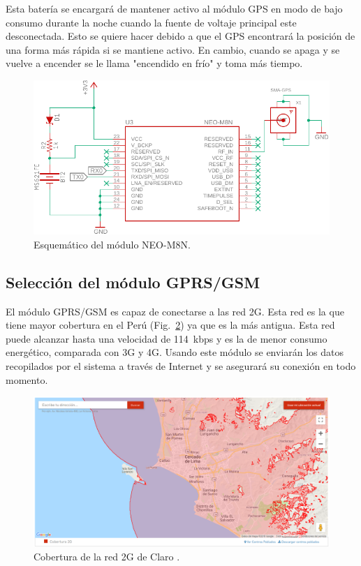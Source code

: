 Esta batería se encargará de mantener activo al módulo GPS en modo de bajo consumo durante la noche cuando la fuente de voltaje principal este desconectada. Esto se quiere hacer debido a que el GPS encontrará la posición de una forma más rápida si se mantiene activo. En cambio, cuando se apaga y se vuelve a encender se le llama "encendido en frío" y toma más tiempo.

\begin{figure}[htbp!]
\centering
\includegraphics[width=\textwidth]{GPS_esquem.pdf}
\caption{Esquemático del módulo NEO-M8N.}
\label{fig:GPS_esquem}
\end{figure}

\subsection{Selección del módulo GPRS/GSM}
El módulo GPRS/GSM es capaz de conectarse a las red 2G. Esta red es la que tiene mayor cobertura en el Perú (Fig.~\ref{fig:Cobertura}) ya que es la más antigua. Esta red puede alcanzar hasta una velocidad de \SI{114}{kbps} y es la de menor consumo energético, comparada con 3G y 4G. Usando este módulo se enviarán los datos recopilados por el sistema a través de Internet y se asegurará su conexión en todo momento.

\begin{figure}[hbtp!]
\centering
\includegraphics[width=\textwidth]{Cobertura_2G.png}
\caption[Cobertura de la red 2G de Claro]{Cobertura de la red 2G de Claro \cite{Cobertura_claro}.}
\label{fig:Cobertura}
\end{figure}


